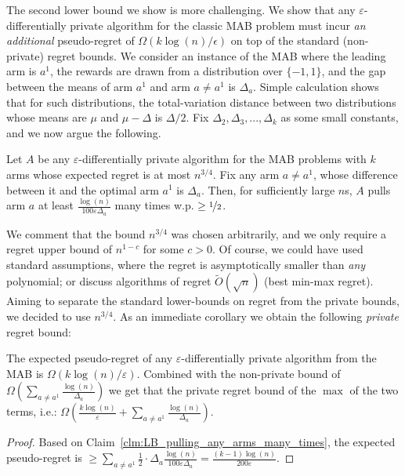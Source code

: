 \documentclass{article}
\begin{document}
The second lower bound we show is more challenging. We show that any $\varepsilon$-differentially private algorithm for the classic MAB problem must incur \emph{an additional} pseudo-regret of $\Omega( k\log(n)/\epsilon)$ on top of the standard (non-private) regret bounds.  We consider an instance of the MAB where the leading arm is $a^1$, the rewards are drawn from a distribution over $\{-1,1\}$, and the gap between the means of arm $a^1$ and arm $a\neq a^1$ is $\Delta_a$. Simple calculation shows that for such distributions, the total-variation distance between two distributions whose means are $\mu$ and $\mu-\Delta$ is $\Delta/2$. Fix $\Delta_2, \Delta_3,...,\Delta_k$ as some small constants, and we now argue the following.
\begin{claim}
\label{clm:LB_pulling_any_arms_many_times}
Let $A$ be any $\varepsilon$-differentially private algorithm for the MAB problems with $k$ arms whose expected regret is at most $n^{3/4}$. Fix any arm $a\neq a^1$, whose difference between it and the optimal arm $a^1$ is $\Delta_a$. Then, for sufficiently large $n$s, $A$ pulls arm $a$ at least $\tfrac {\log(n)}{100\varepsilon\Delta_a}$ many times w.p. $\geq \nicefrac 1 2$.
\end{claim}
We comment that the bound $n^{3/4}$ was chosen arbitrarily, and we only require a regret upper bound of $n^{1-c}$ for some $c>0$. Of course, we could have used standard assumptions, where the regret is asymptotically smaller than \emph{any} polynomial; or discuss algorithms of regret $\tilde O(\sqrt n)$ (best min-max regret). Aiming to separate the standard lower-bounds on regret from the private bounds, we decided to use $n^{3/4}$.
As an immediate corollary we obtain the following \emph{private} regret bound:
\begin{corollary}
\label{cor:LB_private_MAB}
The expected pseudo-regret of any $\varepsilon$-differentially private algorithm from the MAB is $\Omega(k\log(n)/\varepsilon)$. Combined with the non-private bound of $\Omega\left( \sum_{a\neq a^1} \tfrac{\log(n)}{\Delta_a}\right)$ we get that the private regret bound of the $\max$ of the two terms, i.e.: $\Omega\left( \tfrac {k\log(n)}{\varepsilon}+\sum\limits_{a\neq a^1} \tfrac{\log(n)}{\Delta_a}\right)$.
\end{corollary}
\begin{proof}
Based on Claim~\ref{clm:LB_pulling_any_arms_many_times}, the expected pseudo-regret is $\geq \sum\limits_{a\neq a^1} \tfrac 1 2 \cdot \Delta_a \tfrac{\log(n)}{100 \varepsilon\Delta_a} = \tfrac{(k-1)\log(n)}{200\varepsilon}$.
\end{proof}
\end{document}
